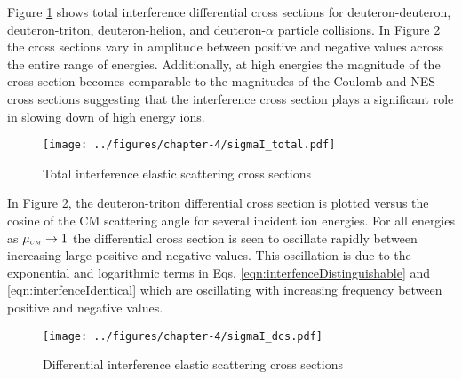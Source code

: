 Figure \ref{fig:interferenceTotal} shows total interference differential cross sections for deuteron-deuteron, deuteron-triton, deuteron-helion, and deuteron-$\alpha$ particle collisions. In Figure \ref{fig:interferenceDCS} the cross sections vary in amplitude between positive and negative values across the entire range of energies. Additionally, at high energies the magnitude of the cross section becomes comparable to the magnitudes of the Coulomb and NES cross sections suggesting that the interference cross section plays a significant role in slowing down of high energy ions.
\begin{figure}[!htb]
    \centering
    \texttt{[image: ../figures/chapter-4/sigmaI\_total.pdf]}
    \caption{Total interference elastic scattering cross sections}
    \label{fig:interferenceTotal}
\end{figure}

In Figure \ref{fig:interferenceDCS}, the deuteron-triton differential cross section is plotted versus the cosine of the CM scattering angle for several incident ion energies. For all energies as $\mucm \rightarrow 1$ the differential cross section is seen to oscillate rapidly between increasing large positive and negative values. This oscillation is due to the exponential and logarithmic terms in Eqs. \eqref{eqn:interfenceDistinguishable} and \eqref{eqn:interfenceIdentical} which are oscillating with increasing frequency between positive and negative values.
\begin{figure}[!htb]
    \centering
    \texttt{[image: ../figures/chapter-4/sigmaI\_dcs.pdf]}
    \caption{Differential interference elastic scattering cross sections}
    \label{fig:interferenceDCS}
\end{figure}